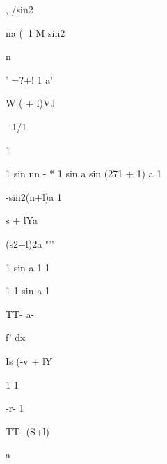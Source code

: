 ,   /sin2 


na (\ 1 M sin2 




n 


'  =?+! 1 a' 


W (  + i)VJ 












- 1/1 

1 


1   sin  nn - 
* 1 sin a sin (271 + 1) a 1 


-siii2(n+l)a 1 




  s  + lYa \ 














 (s2+l)2a "'" 


1 sin a 1   1 














1 1 sin a 1 

TT- a- 


f'  dx 

Is (-v + lY 














1 1 
















-r- 1 








 TT-  (S+l) 


a 





